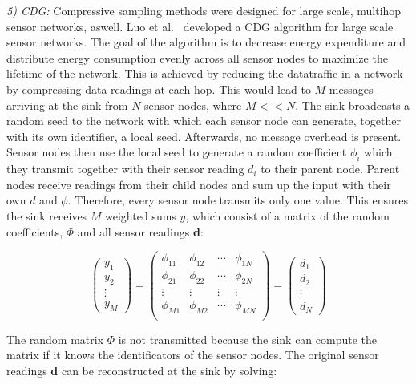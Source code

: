 \textit{5) \ac{CDG}:}
Compressive sampling methods were designed for large scale, multihop sensor
networks, aswell. Luo et al.~\cite{luo2009compressive} developed a \ac{CDG}
algorithm for large scale sensor networks. The goal of the algorithm is to
decrease energy expenditure and distribute energy consumption evenly across all
sensor nodes to maximize the lifetime of the network. This is achieved by
reducing the datatraffic in a network by compressing data readings at each hop.
This would lead to $ M $ messages arriving at the sink from $ N $ sensor nodes,
where $ M << N $. The sink broadcasts a random seed to the network with which
each sensor node can generate, together with its own identifier, a local seed.
Afterwards, no message overhead is present. Sensor nodes then use the local
seed to generate a random coefficient $ \phi_i $ which they transmit together
with their sensor reading $ d_i $ to their parent node. Parent nodes receive
readings from their child nodes and sum up the input with their own $ d $ and $
\phi $. Therefore, every sensor node transmits only one value. This ensures the
sink receives $ M $ weighted sums $ y $, which consist of a matrix of the
random coefficients, $ \Phi $ and all sensor readings \textbf{d}:

$$
\begin{pmatrix}
    y_1 \\
    y_2 \\
    \vdots \\
    y_M
\end{pmatrix}
=
\begin{pmatrix}
    \phi_{11} & \phi_{12} & \dotsb & \phi_{1N}\\
    \phi_{21} & \phi_{22} & \dotsb & \phi_{2N}\\
    \vdots & \vdots & \vdots & \vdots\\
    \phi_{M1} & \phi_{M2} & \dotsb & \phi_{MN}\\
\end{pmatrix}
=
\begin{pmatrix}
    d_1 \\
    d_2 \\
    \vdots \\
    d_N
\end{pmatrix}
$$

The random matrix $ \Phi $ is not transmitted because the sink can compute the
matrix if it knows the identificators of the sensor nodes. The original
sensor readings \textbf{d} can be reconstructed at the sink by solving:

